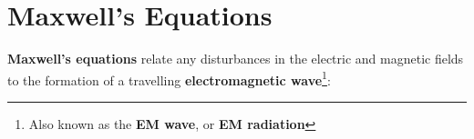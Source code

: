 %
%
%
%
%
%
%
%
%
\section{Maxwell's Equations}
\textbf{Maxwell's equations} relate any disturbances in the electric and
magnetic fields to the formation of a travelling \textbf{electromagnetic
  wave}\footnote{Also known as the \textbf{EM wave}, or
\textbf{EM radiation}}:
%

